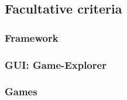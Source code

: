 \subsection{Facultative criteria}
\subsubsection{Framework}
\subsubsection{GUI: Game-Explorer}
\subsubsection{Games}